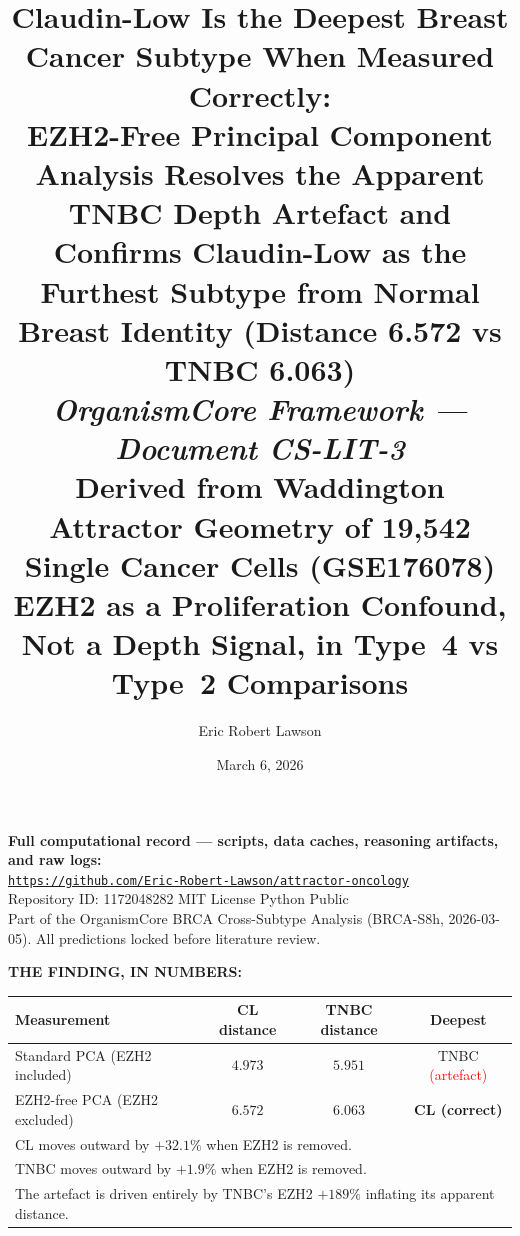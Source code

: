 \documentclass[12pt, a4paper]{article}
\title{
    \vspace{-1em}
    \textbf{Claudin-Low Is the Deepest Breast Cancer
    Subtype When Measured Correctly:}\\[0.5em]
    \large EZH2-Free Principal Component Analysis
    Resolves the Apparent TNBC Depth Artefact
    and Confirms Claudin-Low as the Furthest
    Subtype from Normal Breast Identity
    (Distance 6.572 vs TNBC 6.063)\\[0.4em]
    \normalsize \textit{OrganismCore Framework ---
    Document CS-LIT-3}\\[0.3em]
    \small Derived from Waddington Attractor Geometry
    of 19,542 Single Cancer Cells (GSE176078)\\[0.3em]
    \small EZH2 as a Proliferation Confound, Not
    a Depth Signal, in Type~4 vs Type~2 Comparisons
}
\author[1]{Eric Robert Lawson}
\affil[1]{
    OrganismCore\\
    \href{mailto:OrganismCore@proton.me}
         {OrganismCore@proton.me}\\
    ORCID:
    \href{https://orcid.org/0009-0002-0414-6544}
         {0009-0002-0414-6544}
}
\date{March 6, 2026}
\begin{document}

\maketitle
\thispagestyle{fancy}

\begin{center}
\colorbox{repobox}{
\begin{minipage}{0.88\textwidth}
\vspace{0.5em}
\centering
\textbf{Full computational record --- scripts, data
caches, reasoning artifacts, and raw logs:}\\[0.4em]
\href{https://github.com/Eric-Robert-Lawson/attractor-oncology}
{\texttt{https://github.com/Eric-Robert-Lawson/attractor-oncology}}
\\[0.3em]
\small Repository ID: 1172048282 \textbar{}
MIT License \textbar{}
Python \textbar{}
Public\\[0.2em]
Part of the OrganismCore BRCA Cross-Subtype Analysis
(BRCA-S8h, 2026-03-05).
All predictions locked before literature review.
\vspace{0.5em}
\end{minipage}}
\end{center}

\vspace{0.8em}

\begin{center}
\colorbox{statbox}{
\begin{minipage}{0.88\textwidth}
\vspace{0.5em}
\centering
\textbf{THE FINDING, IN NUMBERS:}\\[0.6em]
\begin{tabular}{lccc}
\toprule
\textbf{Measurement} &
\textbf{CL distance} &
\textbf{TNBC distance} &
\textbf{Deepest} \\
\midrule
Standard PCA
(EZH2 included) &
$4.973$ &
$5.951$ &
TNBC \textcolor{red}{(artefact)} \\[0.4em]
EZH2-free PCA
(EZH2 excluded) &
$\mathbf{6.572}$ &
$\mathbf{6.063}$ &
\textbf{CL \textcolor{green!50!black}{(correct)}} \\
\midrule
\multicolumn{4}{l}{CL moves outward by
$+32.1\%$ when EZH2 is removed.} \\
\multicolumn{4}{l}{TNBC moves outward by
$+1.9\%$ when EZH2 is removed.} \\
\multicolumn{4}{l}{The artefact is driven
entirely by TNBC's EZH2 $+189\%$
inflating its apparent distance.} \\
\bottomrule
\end{tabular}
\vspace{0.5em}
\end{minipage}}
\end{center}
\end{document}
